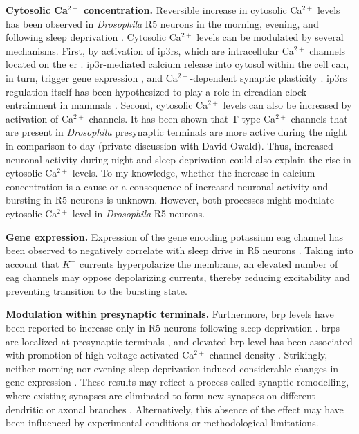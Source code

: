 \documentclass[../main.tex]{subfiles}
\begin{document}
\textbf{Cytosolic Ca$^{2+}$ concentration.}
Reversible increase in cytosolic Ca$^{2+}$ levels has been observed in \textit{Drosophila} R5 neurons in the morning, evening, and following sleep deprivation \parencite{andreaniCircadianProgrammingEllipsoid2022,liuSleepDriveEncoded2016}. Cytosolic Ca$^{2+}$ levels can be modulated by several mechanisms. First, by activation of \glspl{ip3r}, which are intracellular Ca$^{2+}$ channels located on the \gls{er} \parencite{schmitzStructuralBasisActivation2022}. \gls{ip3r}-mediated calcium release into cytosol within the cell can, in turn, trigger gene expression \parencite{schmitzStructuralBasisActivation2022}, and Ca$^{2+}$-dependent synaptic plasticity \parencite{liuSleepDriveEncoded2016}. \glspl{ip3r} regulation itself has been hypothesized to play a role in circadian clock entrainment in mammals \parencite{hamadaRoleInositolTrisphosphateinduced1999}. Second, cytosolic Ca$^{2+}$ levels can also be increased by activation of Ca$^{2+}$ channels. It has been shown that T-type Ca$^{2+}$ channels that are present in \textit{Drosophila} presynaptic terminals are more active during the night in comparison to day (private discussion with David Owald).
Thus, increased neuronal activity during night and sleep deprivation could also explain the rise in cytosolic Ca$^{2+}$ levels. To my knowledge, whether the increase in calcium concentration is a cause or a consequence of increased neuronal activity and bursting in R5 neurons is unknown. However, both processes might modulate cytosolic Ca$^{2+}$ level in \textit{Drosophila} R5 neurons.

\textbf{Gene expression.}
Expression of the gene encoding potassium \gls{eag} channel has been observed to negatively correlate with sleep drive in R5 neurons \parencite{doppSinglecellTranscriptomicsReveals2024}. Taking into account that $K^{+}$ currents hyperpolarize the membrane, an elevated number of \gls{eag} channels may oppose depolarizing currents, thereby reducing excitability and preventing transition to the bursting state.

\textbf{Modulation within presynaptic terminals.}
Furthermore, \gls{brp} levels have been reported to increase only in R5 neurons following sleep deprivation \parencite{liuSleepDriveEncoded2016}. \glspl{brp} are localized at presynaptic terminals \parencite{waghBruchpilotProteinHomology2006}, and elevated \gls{brp} level has been associated with promotion of high-voltage activated Ca$^{2+}$ channel density \parencite{kittelBruchpilotPromotesActive2006}. Strikingly, neither morning nor evening sleep deprivation induced considerable changes in gene expression \parencite{andreaniCircadianProgrammingEllipsoid2022}. These results may reflect a process called synaptic remodelling, where existing synapses are eliminated to form new synapses on different dendritic or axonal branches \parencite{kurupNeuralCircuitRewiring2016}. Alternatively, this absence of the effect may have been influenced by experimental conditions or methodological limitations.
\end{document}
